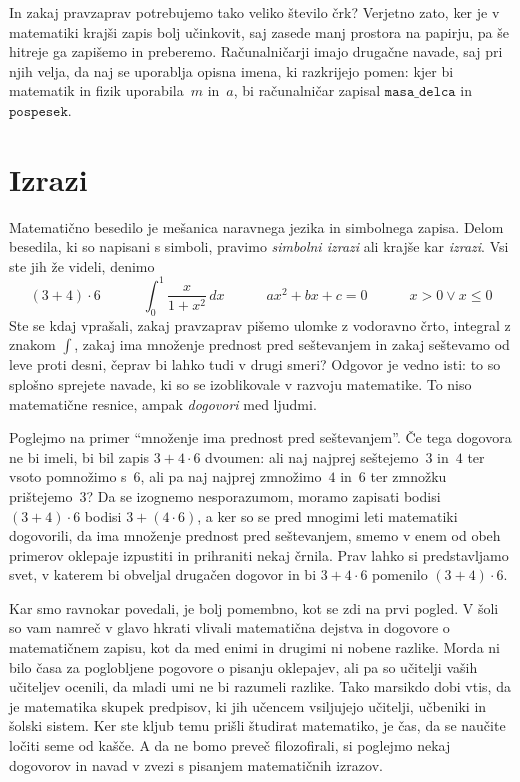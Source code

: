 In zakaj pravzaprav potrebujemo tako veliko število črk? Verjetno zato, ker je v
matematiki krajši zapis bolj učinkovit, saj zasede manj prostora na papirju, pa še hitreje
ga zapišemo in preberemo. Računalničarji imajo drugačne navade, saj pri njih velja, da naj
se uporablja opisna imena, ki razkrijejo pomen: kjer bi matematik in fizik uporabila~$m$
in~$a$, bi računalničar zapisal $\mathtt{masa\_delca}$ in $\texttt{pospesek}$.

\section{Izrazi}
\label{sec:irazi}

Matematično besedilo je mešanica naravnega jezika in simbolnega zapisa. Delom besedila, ki
so napisani s simboli, pravimo \emph{simbolni izrazi} ali krajše kar \emph{izrazi}. Vsi
ste jih že videli, denimo
%
\begin{equation*}
  (3 + 4) \cdot 6 \qquad\quad
  \int_0^1 \frac{x}{1 + x^2} \, dx \qquad\quad
  a x^2 + b x + c = 0 \qquad\quad
  x > 0 \lor x \leq 0
\end{equation*}
%
Ste se kdaj vprašali, zakaj pravzaprav pišemo ulomke z vodoravno črto, integral z znakom
$\int$, zakaj ima množenje prednost pred seštevanjem in zakaj seštevamo od leve proti
desni, čeprav bi lahko tudi v drugi smeri? Odgovor je vedno isti: to so splošno sprejete
navade, ki so se izoblikovale v razvoju matematike. To niso matematične resnice, ampak
\emph{dogovori} med ljudmi.

Poglejmo na primer ``množenje ima prednost pred seštevanjem''. Če tega dogovora ne bi
imeli, bi bil zapis $3 + 4 \cdot 6$ dvoumen: ali naj najprej seštejemo~$3$ in~$4$ ter
vsoto pomnožimo s~$6$, ali pa naj najprej zmnožimo~$4$ in~$6$ ter zmnožku prištejemo~$3$?
Da se izognemo nesporazumom, moramo zapisati bodisi $(3 + 4) \cdot 6$ bodisi
$3 + (4 \cdot 6)$, a ker so se pred mnogimi leti matematiki dogovorili, da ima množenje
prednost pred seštevanjem, smemo v enem od obeh primerov oklepaje izpustiti in prihraniti
nekaj črnila. Prav lahko si predstavljamo svet, v katerem bi obveljal drugačen dogovor in
bi $3 + 4 \cdot 6$ pomenilo $(3 + 4) \cdot 6$.

%
Kar smo ravnokar povedali, je bolj pomembno, kot se zdi na prvi pogled. V šoli so vam
namreč v glavo hkrati vlivali matematična dejstva in dogovore o matematičnem zapisu, kot
da med enimi in drugimi ni nobene razlike. Morda ni bilo časa za poglobljene pogovore o
pisanju oklepajev, ali pa so učitelji vaših učiteljev ocenili, da mladi umi ne bi razumeli
razlike. Tako marsikdo dobi vtis, da je matematika skupek predpisov, ki jih učencem
vsiljujejo učitelji, učbeniki in šolski sistem. Ker ste kljub temu prišli študirat
matematiko, je čas, da se naučite ločiti seme od kašče. A da ne bomo preveč filozofirali,
si poglejmo nekaj dogovorov in navad v zvezi s pisanjem matematičnih izrazov.

